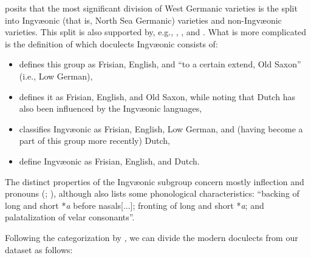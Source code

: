 \documentclass[a4paper]{article}
\begin{document}
\citet{stiles2013pan-west} posits that
the most significant division of West Germanic varieties is
the split into Ingv\ae{}onic (that is, North Sea Germanic) varieties
and non-Ingv\ae{}onic varieties.
This split is also supported by, e.g., \citet[p. 7]{harbert2007germanic}, \citet[pp. 117--123]{sonderegger1979grundzuege}, and \cite{auwera2017germanic}.
What is more complicated is the definition of which doculects Ingv\ae{}onic consists of:
\begin{itemize}
\item 
\citet{stiles2013pan-west} defines this group
as Frisian, English, and ``to a certain extend, Old Saxon'' (i.e., Low German),

\item
\citet[pp. 7, 17]{harbert2007germanic} defines it
as Frisian, English, and Old Saxon,
while noting that Dutch has also been influenced by the Ingv\ae{}onic languages,

\item
\citet[pp. 71, 117--123]{sonderegger1979grundzuege} classifies Ingv\ae{}onic
as Frisian, English, Low German, and (having become a part of this group more recently) Dutch, %

\item
{} define Ingv\ae{}onic as Frisian, English, and Dutch.
\end{itemize}

The distinct properties of the Ingv\ae{}onic subgroup
concern mostly inflection and pronouns
(\citet{stiles2013pan-west}; \citet[pp. 7-8]{harbert2007germanic}),
although \citet{stiles2013pan-west} also lists some phonological characteristics:
``backing of long and short *\textit{a} before nasals[...];
fronting of long and short *\textit{a};
and palatalization of velar consonants''.

Following the categorization by \citet{harbert2007germanic}, %
we can divide the modern doculects from our dataset as follows:
\end{document}
